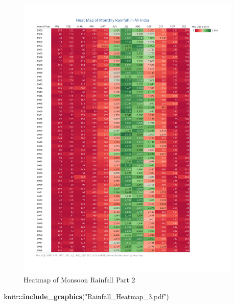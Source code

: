 \documentclass[12pt,openany]{book}
\newenvironment{Shaded}{\begin{snugshade}}{\end{snugshade}}
\newcommand{\KeywordTok}[1]{\textcolor[rgb]{0.13,0.29,0.53}{\textbf{#1}}}
\newcommand{\NormalTok}[1]{#1}
\newcommand{\OperatorTok}[1]{\textcolor[rgb]{0.81,0.36,0.00}{\textbf{#1}}}
\newcommand{\StringTok}[1]{\textcolor[rgb]{0.31,0.60,0.02}{#1}}
\begin{document}
\begin{figure}
\centering
\includegraphics{Rainfall_Heatmap_2.pdf}
\caption{\label{fig:unnamed-chunk-13}Heatmap of Monsoon Rainfall Part 2}
\end{figure}

\begin{Shaded}
\begin{Highlighting}[]
\NormalTok{knitr}\OperatorTok{::}\KeywordTok{include_graphics}\NormalTok{(}\StringTok{"Rainfall_Heatmap_3.pdf"}\NormalTok{)}
\end{Highlighting}
\end{Shaded}
\end{document}
